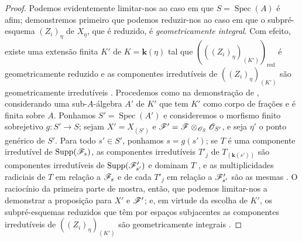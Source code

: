 \begin{proof}
\label{IV.9.8.6-proof}
Podemos evidentemente limitar-nos ao caso em que $S=\operatorname{Spec}(A)$ é afim; demonstremos primeiro que podemos reduzir-nos ao caso em que o subpré-esquema $(Z_i)_\eta$ de $X_\eta$, que é reduzido, é \emph{geometricamente integral}.
Com efeito, existe uma extensão finita $K'$ de $K=\mathbf{k}(\eta)$ tal que $(((Z_i)_\eta)_{(K')})_{\mathrm{red}}$ é geometricamente reduzido e as componentes irredutíveis de $((Z_i)_\eta)_{(K')}$ são geometricamente irredutíveis .
Procedemos como na demonstração de , considerando uma sub-$A$-álgebra $A'$ de $K'$ que tem $K'$ como corpo de frações e é finita sobre $A$.
Ponhamos $S'=\operatorname{Spec}(A')$ e consideremos o morfismo finito sobrejetivo $g:S'\to S$; sejam $X'=X_{(S')}$ e $\mathscr{F}'=\mathscr{F}\otimes_{\mathscr{O}_S}\mathscr{O}_{S'}$, e seja $\eta'$ o ponto genérico de $S'$.
Para todo $s'\in S'$, ponhamos $s=g(s')$; se $T$ é uma componente irredutível de $\operatorname{Supp}(\mathscr{F}_s)$, as componentes irredutíveis $T'_j$ de $T_{(\mathbf{k}(s'))}$ são componentes irredutíveis de $\operatorname{Supp}(\mathscr{F}'_{s'})$ e dominam $T$ , e as multiplicidades radiciais de $T$ em relação a $\mathscr{F}_s$ e de cada $T'_j$ em relação a $\mathscr{F}'_{s'}$ são as mesmas .
O raciocínio da primeira parte de  mostra, então, que podemos limitar-nos a demonstrar a proposição para $X'$ e $\mathscr{F}'$; e, em virtude da escolha de $K'$, os subpré-esquemas reduzidos que têm por espaços subjacentes as componentes irredutíveis de $((Z_i)_\eta)_{(K')}$ são geometricamente integrais .


\end{proof}
